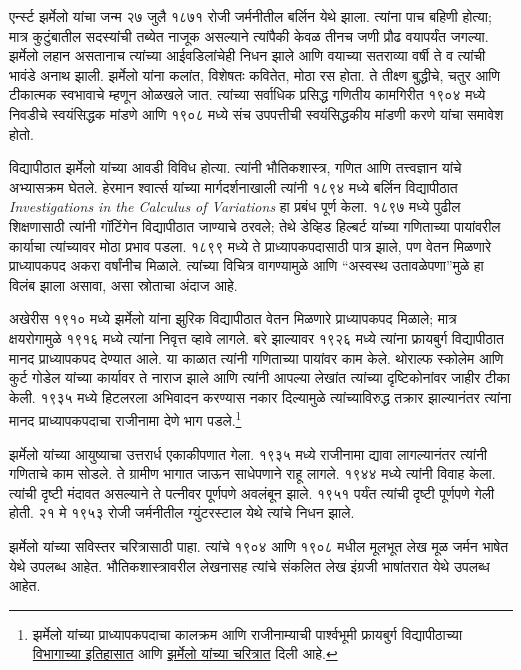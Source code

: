 \documentclass[../../../include/open-logic-section]{subfiles}
\begin{document}



एर्न्स्ट झर्मेलो यांचा जन्म २७ जुलै १८७१ रोजी जर्मनीतील बर्लिन येथे झाला. त्यांना पाच बहिणी होत्या; मात्र कुटुंबातील सदस्यांची तब्येत नाजूक असल्याने त्यांपैकी केवळ तीनच जणी प्रौढ वयापर्यंत जगल्या. झर्मेलो लहान असतानाच त्यांच्या आईवडिलांचेही निधन झाले आणि वयाच्या सतराव्या वर्षी ते व त्यांची भावंडे अनाथ झाली. झर्मेलो यांना कलांत, विशेषतः कवितेत, मोठा रस होता. ते तीक्ष्ण बुद्धीचे, चतुर आणि टीकात्मक स्वभावाचे म्हणून ओळखले जात. त्यांच्या सर्वाधिक प्रसिद्ध गणितीय कामगिरीत १९०४ मध्ये निवडीचे स्वयंसिद्धक मांडणे आणि १९०८ मध्ये संच उपपत्तीची स्वयंसिद्धकीय मांडणी करणे यांचा समावेश होतो.

विद्यापीठात झर्मेलो यांच्या आवडी विविध होत्या. त्यांनी भौतिकशास्त्र, गणित आणि तत्त्वज्ञान यांचे अभ्यासक्रम घेतले. हेरमान श्वार्त्स यांच्या मार्गदर्शनाखाली त्यांनी १८९४ मध्ये बर्लिन विद्यापीठात \emph{Investigations in
  the Calculus of Variations} हा प्रबंध पूर्ण केला. १८९७ मध्ये पुढील शिक्षणासाठी त्यांनी गॉटिंगेन विद्यापीठात जाण्याचे ठरवले; तेथे डेव्हिड हिल्बर्ट यांच्या गणिताच्या पायांवरील कार्याचा त्यांच्यावर मोठा प्रभाव पडला. १८९९ मध्ये ते प्राध्यापकपदासाठी पात्र झाले, पण वेतन मिळणारे प्राध्यापकपद अकरा वर्षांनीच मिळाले. त्यांच्या विचित्र वागण्यामुळे आणि “अस्वस्थ उतावळेपणा”मुळे हा विलंब झाला असावा, असा स्रोताचा अंदाज आहे.

अखेरीस १९१० मध्ये झर्मेलो यांना झुरिक विद्यापीठात वेतन मिळणारे प्राध्यापकपद मिळाले; मात्र क्षयरोगामुळे १९१६ मध्ये त्यांना निवृत्त व्हावे लागले. बरे झाल्यावर १९२६ मध्ये त्यांना फ्रायबुर्ग विद्यापीठात मानद प्राध्यापकपद देण्यात आले. या काळात त्यांनी गणिताच्या पायांवर काम केले. थोराल्फ स्कोलेम आणि कुर्ट गोडेल यांच्या कार्यावर ते नाराज झाले आणि त्यांनी आपल्या लेखांत त्यांच्या दृष्टिकोनांवर जाहीर टीका केली. १९३५ मध्ये हिटलरला अभिवादन करण्यास नकार दिल्यामुळे त्यांच्याविरुद्ध तक्रार झाल्यानंतर त्यांना मानद प्राध्यापकपदाचा राजीनामा देणे भाग पडले.\footnote{झर्मेलो यांच्या प्राध्यापकपदाचा कालक्रम आणि राजीनाम्याची पार्श्वभूमी फ्रायबुर्ग विद्यापीठाच्या \href{https://uni-freiburg.de/math/geschichte-i/}{विभागाच्या इतिहासात} आणि \href{https://home.mathematik.uni-freiburg.de/mildenberger/freiburg2014/zermelo.html}{झर्मेलो यांच्या चरित्रात} दिली आहे.}

झर्मेलो यांच्या आयुष्याचा उत्तरार्ध एकाकीपणात गेला. १९३५ मध्ये राजीनामा द्यावा लागल्यानंतर त्यांनी गणिताचे काम सोडले. ते ग्रामीण भागात जाऊन साधेपणाने राहू लागले. १९४४ मध्ये त्यांनी विवाह केला. त्यांची दृष्टी मंदावत असल्याने ते पत्नीवर पूर्णपणे अवलंबून झाले. १९५१ पर्यंत त्यांची दृष्टी पूर्णपणे गेली होती. २१ मे १९५३ रोजी जर्मनीतील ग्युंटरस्टाल येथे त्यांचे निधन झाले.

\begin{reading}
झर्मेलो यांच्या सविस्तर चरित्रासाठी \citet{Ebbinghaus2015} पाहा. त्यांचे १९०४ आणि १९०८ मधील मूलभूत लेख मूळ जर्मन भाषेत \citep{Zermelo1904,Zermelo1908} येथे उपलब्ध आहेत. भौतिकशास्त्रावरील लेखनासह त्यांचे संकलित लेख इंग्रजी भाषांतरात \citep{Ebbinghaus2010,Ebbinghaus2013} येथे उपलब्ध आहेत.
\end{reading}
\end{document}

